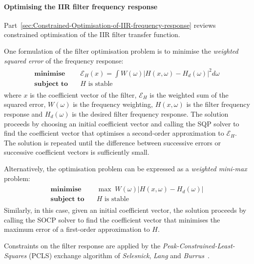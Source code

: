 \documentclass[a4paper,twoside,10pt,english]{report}
\begin{document}
\paragraph{Optimising the IIR filter frequency response}
Part~\ref{sec:Constrained-Optimisation-of-IIR-frequency-response} reviews
constrained optimisation of the IIR filter transfer function.

One formulation of the filter optimisation problem is to
minimise the \emph{weighted squared error} of the frequency response:
\begin{align}\label{eqn:Definition-of-squared-response-error}
\begin{split}
  \textbf{minimise}\quad &\mathcal{E}_{H}\left(x\right) =
  \int W\left(\omega\right)\left|H\left(x,\omega\right)
    -H_{d}\left(\omega\right)\right|^{2}d\omega \\
\textbf{subject to}\quad &H\text{ is stable} 
\end{split}
\end{align}
where $x$ is the coefficient vector of the filter, $\mathcal{E}_{H}$ is
the weighted sum of the squared error, $W\left(\omega\right)$ is the frequency
weighting, $H\left(x,\omega\right)$ is the filter frequency response and 
$H_{d}\left(\omega\right)$ is the desired filter frequency response.
The solution proceeds by choosing an initial coefficient vector
 and calling the SQP solver to find the coefficient vector that
optimises a second-order approximation to $\mathcal{E}_{H}$. The solution is
repeated until the difference between successive errors or
successive coefficient vectors is sufficiently small.

Alternatively, the optimisation problem can be expressed as a \emph{weighted
mini-max} problem:
\begin{align}\label{eqn:Definition-of-minimax-response-error}
\begin{split}
\textbf{minimise}\quad &\max\;W\left(\omega\right)\left|H\left(x,\omega\right)
  -H_{d}\left(\omega\right)\right|\\
\textbf{subject to}\quad &H\text{ is stable} 
\end{split}
\end{align}
Similarly, in this case, given an initial coefficient vector, the
solution proceeds by calling the SOCP solver to find the coefficient vector
that minimises the maximum error of a first-order approximation to $H$.

Constraints on the filter response are applied by the 
\emph{Peak-Constrained-Least-Squares} (PCLS) exchange algorithm of
\emph{Selesnick}, \emph{Lang} and
\emph{Burrus}~\cite{SelesnickLangBurrus_ConstrainedLeastSquareMultiBandFIRFilters}. 
\end{document}

